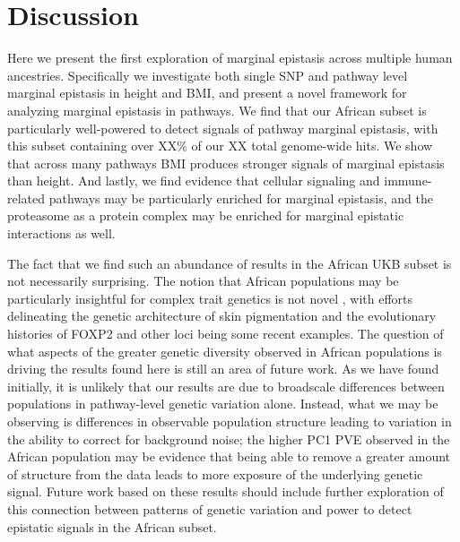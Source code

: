 \documentclass[12pt,a4paper]{article}
\begin{document}
\section{Discussion}\label{InterPath-Discussion}

Here we present the first exploration of marginal epistasis across multiple human ancestries. Specifically we investigate both single SNP and pathway level marginal epistasis in height and BMI, and present a novel framework for analyzing marginal epistasis in pathways. We find that our African subset is particularly well-powered to detect signals of pathway marginal epistasis, with this subset containing over XX\% of our XX total genome-wide hits. We show that across many pathways BMI produces stronger signals of marginal epistasis than height. And lastly, we find evidence that cellular signaling and immune-related pathways may be particularly enriched for marginal epistasis, and the proteasome as a protein complex may be enriched for marginal epistatic interactions as well. 

The fact that we find such an abundance of results in the African UKB subset is not necessarily surprising. The notion that African populations may be particularly insightful for complex trait genetics is not novel \citep{Rotimi2017,Choudhury2018,Martin2018,Bentley2020}, with efforts delineating the genetic architecture of skin pigmentation \citep{Martin2017b,Crawford2017b} and the evolutionary histories of FOXP2 and other loci \citep{Atkinson2018,Sugden2018} being some recent examples. The question of what aspects of the greater genetic diversity observed in African populations is driving the results found here is still an area of future work. As we have found initially, it is unlikely that our results are due to broadscale differences between populations in pathway-level genetic variation alone. Instead, what we may be observing is differences in observable population structure leading to variation in the ability to correct for background noise; the higher PC1 PVE observed in the African population may be evidence that being able to remove a greater amount of structure from the data leads to more exposure of the underlying genetic signal. Future work based on these results should include further exploration of this connection between patterns of genetic variation and power to detect epistatic signals in the African subset.  
\end{document}
